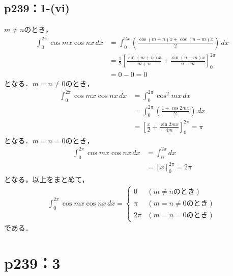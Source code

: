 \documentclass[a4paper,10pt,fleqn]{ltjsarticle}
\begin{document}
\subsection*{p239：1-(vi)}
\begin{screen}
    $m \ne n$のとき，
    \begin{align*}
        \int_{0}^{2\pi} \cos mx \cos nx \, dx & = \int_{0}^{2\pi} \left (\frac{\cos(m+n)x+\cos(n-m)x}{2}\right) \, dx                 \\
                                              & = \frac{1}{2} \left [\frac{\sin (m+n)x}{m+n}+\frac{\sin(n-m)x}{n-m}\right]_{0}^{2\pi} \\
                                              & = 0-0 =0
    \end{align*}
    となる．$m =n \ne 0$のとき，
    \begin{align*}
        \int_{0}^{2\pi} \cos mx \cos nx \, dx & = \int_{0}^{2\pi} \cos^2 mx \, dx                                \\
                                              & = \int_{0}^{2\pi} \left (\frac{1+\cos 2mx}{2}\right) \, dx       \\
                                              & = \left [\frac{x}{2}+\frac{\sin 2mx}{4m}\right]_{0}^{2\pi} = \pi
    \end{align*}
    となる．$m =n =0$のとき，
    \begin{align*}
        \int_{0}^{2\pi} \cos mx \cos nx \, dx & = \int_{0}^{2\pi} dx    \\
                                              & = [x]_{0}^{2\pi} = 2\pi
    \end{align*}
    となる，以上をまとめて，
    \begin{align*}
        \int_{0}^{2\pi} \cos mx \cos nx \, dx =
        \begin{cases}
            0     & (m \ne n のとき)   \\
            \pi   & (m = n\ne 0のとき) \\
            2 \pi & (m=n=0 のとき)
        \end{cases}
    \end{align*}
    である．
\end{screen}

\section*{p239：3}
\end{document}
